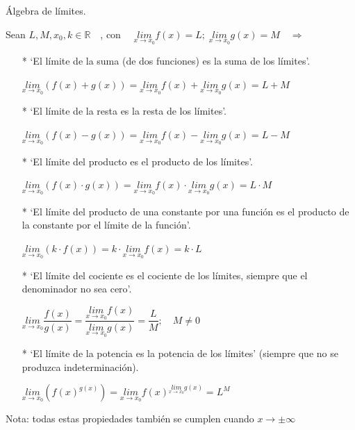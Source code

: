 		\begin{teor}{Álgebra de límites. }
		
		Sean $L, M, x_0, k \in \mathbb R \quad $, con $\quad \underset {x \to x_0}{lim}{f(x)}=L; \; \underset {x \to x_0}{lim}{g(x)}=M \quad \Rightarrow$
		
		\begin{itemize}
			\item [*] `El límite de la suma (de dos funciones) es la suma de los límites'.
			
				$\underset {x\to x_0}{lim}{(f(x)+g(x))}=\underset {x\to x_0}{lim}{f(x)}+\underset {x\to x_0}{lim}{g(x)}=L+M$
			\item [*]`El límite de la resta es la resta de los límites'.
			
				$\underset {x\to x_0}{lim}{(f(x)-g(x))}=\underset {x\to x_0}{lim}{f(x)}-\underset {x\to x_0}{lim}{g(x)}=L-M$
			\item [*]`El límite del producto es el producto de los límites'.
						
				$\underset {x\to x_0}{lim}{(f(x)\cdot g(x))}=\underset {x\to x_0}{lim}{f(x)} \cdot \underset {x\to x_0}{lim}{g(x)}=L\cdot M$

			\item [*]`El límite del producto de una constante por una función es el producto de la constante por el límite de la función'.
						
				$\underset {x\to x_0}{lim}{(k\cdot f(x))}=k\cdot \underset {x\to x_0}{lim}{f(x)}=k\cdot L$
				
			\item [*]`El límite del cociente es el cociente de los límites, siempre que el denominador no sea cero'.
						
				$\underset {x\to x_0}{lim}{\dfrac {f(x)} {g(x)}}= \dfrac {\underset {x\to x_0}{lim}{f(x)}} {\underset {x\to x_0}{lim}{g(x)}}=\dfrac L M; \quad M\neq 0$
				
				\item [*]`El límite de la potencia es la potencia de los límites' (siempre que no se produzca indeterminación).
						
				$\underset {x\to x_0}  {lim} { \left( f(x) ^ {g(x)} \right) } = \underset {x \to x_0}{lim}{f(x)} ^ { \underset {x \to x_0}{lim}{g(x)}  } = L^M$
				
				\end{itemize}
				
				Nota: todas estas propiedades también se cumplen cuando $x\to \pm\infty$
			
		\end{teor}
		
